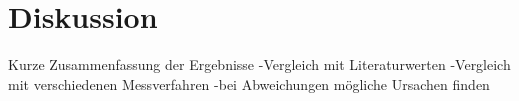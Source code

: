 \section{Diskussion}
\label{sec:Diskussion}

Kurze Zusammenfassung der Ergebnisse
-Vergleich mit Literaturwerten
-Vergleich mit verschiedenen Messverfahren
-bei Abweichungen mögliche Ursachen finden